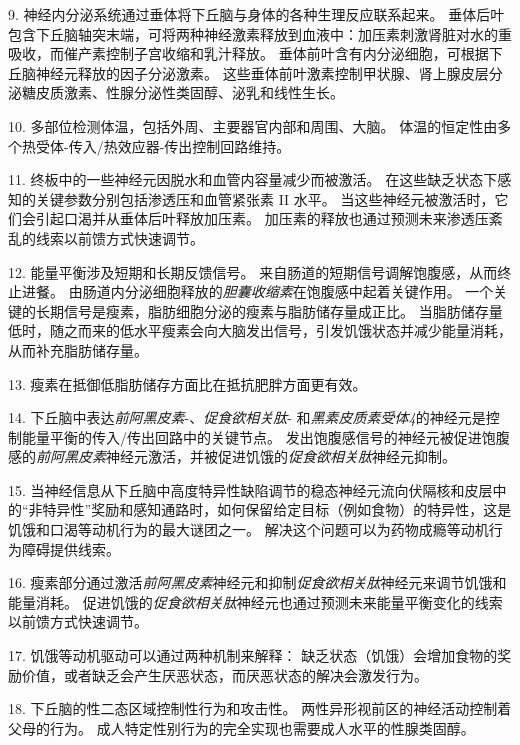 9. 神经内分泌系统通过垂体将下丘脑与身体的各种生理反应联系起来。
垂体后叶包含下丘脑轴突末端，可将两种神经激素释放到血液中：加压素刺激肾脏对水的重吸收，而催产素控制子宫收缩和乳汁释放。
垂体前叶含有内分泌细胞，可根据下丘脑神经元释放的因子分泌激素。
这些垂体前叶激素控制甲状腺、肾上腺皮层分泌糖皮质激素、性腺分泌性类固醇、泌乳和线性生长。


10. 多部位检测体温，包括外周、主要器官内部和周围、大脑。
体温的恒定性由多个热受体-传入/热效应器-传出控制回路维持。


11. 终板中的一些神经元因脱水和血管内容量减少而被激活。
在这些缺乏状态下感知的关键参数分别包括渗透压和血管紧张素 II 水平。
当这些神经元被激活时，它们会引起口渴并从垂体后叶释放加压素。
加压素的释放也通过预测未来渗透压紊乱的线索以前馈方式快速调节。 


12. 能量平衡涉及短期和长期反馈信号。
来自肠道的短期信号调解饱腹感，从而终止进餐。
由肠道内分泌细胞释放的\textit{胆囊收缩素}在饱腹感中起着关键作用。
一个关键的长期信号是瘦素，脂肪细胞分泌的瘦素与脂肪储存量成正比。
当脂肪储存量低时，随之而来的低水平瘦素会向大脑发出信号，引发饥饿状态并减少能量消耗，从而补充脂肪储存量。 


13. 瘦素在抵御低脂肪储存方面比在抵抗肥胖方面更有效。 


14. 下丘脑中表达\textit{前阿黑皮素}-、\textit{促食欲相关肽}- 和\textit{黑素皮质素受体4}的神经元是控制能量平衡的传入/传出回路中的关键节点。
发出饱腹感信号的神经元被促进饱腹感的\textit{前阿黑皮素}神经元激活，并被促进饥饿的\textit{促食欲相关肽}神经元抑制。


15. 当神经信息从下丘脑中高度特异性缺陷调节的稳态神经元流向伏隔核和皮层中的“非特异性”奖励和感知通路时，如何保留给定目标（例如食物）的特异性，这是饥饿和口渴等动机行为的最大谜团之一。
解决这个问题可以为药物成瘾等动机行为障碍提供线索。 


16. 瘦素部分通过激活\textit{前阿黑皮素}神经元和抑制\textit{促食欲相关肽}神经元来调节饥饿和能量消耗。
促进饥饿的\textit{促食欲相关肽}神经元也通过预测未来能量平衡变化的线索以前馈方式快速调节。


17. 饥饿等动机驱动可以通过两种机制来解释：
缺乏状态（饥饿）会增加食物的奖励价值，或者缺乏会产生厌恶状态，而厌恶状态的解决会激发行为。 


18. 下丘脑的性二态区域控制性行为和攻击性。
两性异形视前区的神经活动控制着父母的行为。
成人特定性别行为的完全实现也需要成人水平的性腺类固醇。

